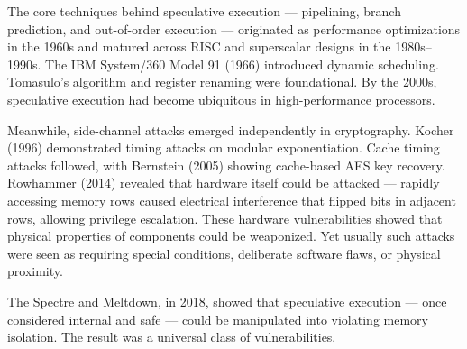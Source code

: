 \begin{historical}
The core techniques behind speculative execution — pipelining, branch prediction, and out-of-order execution — originated as performance optimizations in the 1960s and matured across RISC and superscalar designs in the 1980s–1990s. The IBM System/360 Model 91 (1966) introduced dynamic scheduling. Tomasulo's algorithm and register renaming were foundational. By the 2000s, speculative execution had become ubiquitous in high-performance processors.

Meanwhile, side-channel attacks emerged independently in cryptography. Kocher (1996) demonstrated timing attacks on modular exponentiation. Cache timing attacks followed, with Bernstein (2005) showing cache-based AES key recovery. Rowhammer (2014) revealed that hardware itself could be attacked — rapidly accessing memory rows caused electrical interference that flipped bits in adjacent rows, allowing privilege escalation. These hardware vulnerabilities showed that physical properties of components could be weaponized. Yet usually such attacks were seen as requiring special conditions, deliberate software flaws, or physical proximity.

The Spectre and Meltdown, in 2018, showed that speculative execution — once considered internal and safe — could be manipulated into violating memory isolation. The result was a universal class of vulnerabilities.
\end{historical}
